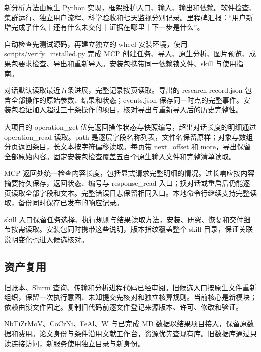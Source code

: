 \documentclass[11pt,a4paper]{ctexart}
\begin{document}
新分析方法由原生 Python 实现，框架维护入口、输入、输出和依赖。软件检查、集群运行、独立用户流程、科学验收和七天监视分别记录。里程碑汇报：“用户新增完成了什么｜还有什么未交付｜证据在哪里｜下一步是什么”。



自动检查先测试源码，再建立独立的 wheel 安装环境，使用 scripts/\allowbreak{}verify\_\allowbreak{}installed.py 完成 MCP 创建任务、导入、原生分析、图片预览、成果包要求检查、导出和重新导入。安装包携带同一依赖锁文件、skill 与使用指南。



对话默认读取最近五条进展，完整记录按页读取。导出的 research-record.json 包含全部操作的原始参数、结果和状态；events.json 保存同一时点的完整事件。安装包验证加入超过三十条操作的项目，核对导出与重新导入后的历史完整性。



大项目的 operation\_\allowbreak{}get 优先返回操作状态与快照编号，超出对话长度的明细通过 operation\_\allowbreak{}read 读取。path 是逐层字段名称列表，文件名保留原样；对象与数组分页返回条目，长文本按字符偏移读取。每页带 next\_\allowbreak{}offset 和 more，导出保留全部原始内容。固定安装包检查覆盖五百个原生输入文件和完整清单读取。



MCP 返回处统一检查内容长度，包括显式请求完整明细的情况。过长响应按内容摘要持久保存，返回状态、编号与 response\_\allowbreak{}read 入口；换对话或重启后仍能逐页读取全部字段和文本。完整错误日志保留相同入口。本地命令行继续支持完整读取，备份同时保存已发布的响应记录。



skill 入口保留任务选择、执行规则与结果读取方法，安装、研究、恢复和交付细节按需读取。安装包同时携带这些说明，版本指纹覆盖整个 skill 目录，保证关联说明变化也进入候选核对。



\subsection{资产复用}


旧账本、Slurm 查询、传输和分析进程代码已经审阅。旧候选入口按原生文件重新组织，保留一次执行意图、未知提交先核对和独立核算规则。当前核心是新模块；依赖由锁文件固定。复制旧代码前逐文件登记来源版本、许可、修改和验证。



NbTiZrMoV、CoCrNi、FeAl、W 与已完成 MD 数据以结果项目接入，保留原数据和费用。论文身份与条件沿用文献工作台，资源优先查现有库。旧数据库通过只读连接访问，新服务使用独立目录与新身份。
\end{document}
